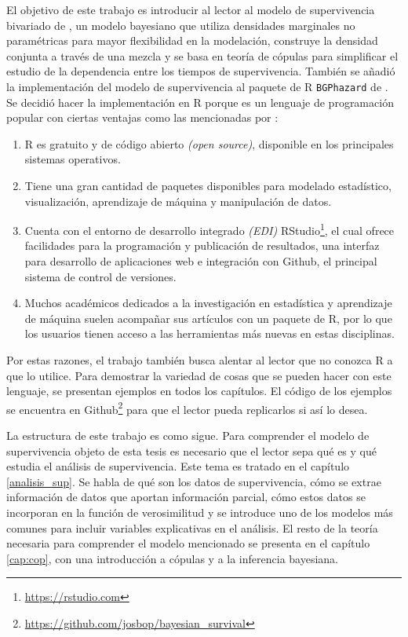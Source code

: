 \documentclass[11pt,a4paper]{article}
\begin{document}
El objetivo de este trabajo es introducir al lector al modelo de supervivencia bivariado de \citet{nieto}, un modelo bayesiano que utiliza densidades marginales no paramétricas para mayor flexibilidad en la modelación, construye la densidad conjunta a través de una mezcla y se basa en teoría de cópulas para simplificar el estudio de la dependencia entre los tiempos de supervivencia. También se añadió la implementación del modelo de supervivencia al paquete de R \texttt{BGPhazard} de \citet{bgphazard}. Se decidió hacer la implementación en R porque es un lenguaje de programación popular con ciertas ventajas como las mencionadas por \citet{advanced_r}:
\begin{enumerate}
\item R es gratuito y de código abierto \textit{(open source)}, disponible en los principales sistemas operativos.
\item Tiene una gran cantidad de paquetes disponibles para modelado estadístico, visualización, aprendizaje de máquina y manipulación de datos.
\item Cuenta con el entorno de desarrollo integrado \textit{(EDI)} RStudio\footnote{\url{https://rstudio.com}}, el cual ofrece facilidades para la programación y publicación de resultados, una interfaz para desarrollo de aplicaciones web e integración con Github, el principal sistema de control de versiones.
\item Muchos académicos dedicados a la investigación en estadística y aprendizaje de máquina suelen acompañar sus artículos con un paquete de R, por lo que los usuarios tienen acceso a las herramientas más nuevas en estas disciplinas.
\end{enumerate}
Por estas razones, el trabajo también busca alentar al lector que no conozca R a que lo utilice. Para demostrar la variedad de cosas que se pueden hacer con este lenguaje, se presentan ejemplos en todos los capítulos. El código de los ejemplos se encuentra en Github\footnote{\url{https://github.com/josbop/bayesian_survival}} para que el lector pueda replicarlos si así lo desea.

La estructura de este trabajo es como sigue. Para comprender el modelo de supervivencia objeto de esta tesis es necesario que el lector sepa qué es y qué estudia el análisis de supervivencia. Este tema es tratado en el capítulo \ref{analisis_sup}. Se habla de qué son los datos de supervivencia, cómo se extrae información de datos que aportan información parcial, cómo estos datos se incorporan en la función de verosimilitud y se introduce uno de los modelos más comunes para incluir variables explicativas en el análisis. El resto de la teoría necesaria para comprender el modelo mencionado se presenta en el capítulo \ref{cap:cop}, con una introducción a cópulas y a la inferencia bayesiana.
\end{document}
